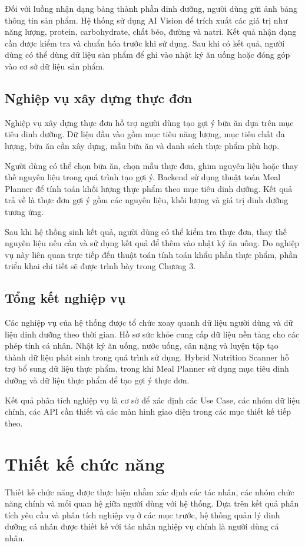 \documentclass[12pt, a4paper]{report}
\begin{document}
Đối với luồng nhận dạng bảng thành phần dinh dưỡng, người dùng gửi ảnh bảng thông tin sản phẩm. Hệ thống sử dụng AI Vision để trích xuất các giá trị như năng lượng, protein, carbohydrate, chất béo, đường và natri. Kết quả nhận dạng cần được kiểm tra và chuẩn hóa trước khi sử dụng. Sau khi có kết quả, người dùng có thể dùng dữ liệu sản phẩm để ghi vào nhật ký ăn uống hoặc đóng góp vào cơ sở dữ liệu sản phẩm.

\subsection{Nghiệp vụ xây dựng thực đơn}Nghiệp vụ xây dựng thực đơn hỗ trợ người dùng tạo gợi ý bữa ăn dựa trên mục tiêu dinh dưỡng. Dữ liệu đầu vào gồm mục tiêu năng lượng, mục tiêu chất đa lượng, bữa ăn cần xây dựng, mẫu bữa ăn và danh sách thực phẩm phù hợp.

Người dùng có thể chọn bữa ăn, chọn mẫu thực đơn, ghim nguyên liệu hoặc thay thế nguyên liệu trong quá trình tạo gợi ý. Backend sử dụng thuật toán Meal Planner để tính toán khối lượng thực phẩm theo mục tiêu dinh dưỡng. Kết quả trả về là thực đơn gợi ý gồm các nguyên liệu, khối lượng và giá trị dinh dưỡng tương ứng.

Sau khi hệ thống sinh kết quả, người dùng có thể kiểm tra thực đơn, thay thế nguyên liệu nếu cần và sử dụng kết quả để thêm vào nhật ký ăn uống. Do nghiệp vụ này liên quan trực tiếp đến thuật toán tính toán khẩu phần thực phẩm, phần triển khai chi tiết sẽ được trình bày trong Chương 3.

\subsection{Tổng kết nghiệp vụ}Các nghiệp vụ của hệ thống được tổ chức xoay quanh dữ liệu người dùng và dữ liệu dinh dưỡng theo thời gian. Hồ sơ sức khỏe cung cấp dữ liệu nền tảng cho các phép tính cá nhân. Nhật ký ăn uống, nước uống, cân nặng và luyện tập tạo thành dữ liệu phát sinh trong quá trình sử dụng. Hybrid Nutrition Scanner hỗ trợ bổ sung dữ liệu thực phẩm, trong khi Meal Planner sử dụng mục tiêu dinh dưỡng và dữ liệu thực phẩm để tạo gợi ý thực đơn.

Kết quả phân tích nghiệp vụ là cơ sở để xác định các Use Case, các nhóm dữ liệu chính, các API cần thiết và các màn hình giao diện trong các mục thiết kế tiếp theo.

\section{Thiết kế chức năng}Thiết kế chức năng được thực hiện nhằm xác định các tác nhân, các nhóm chức năng chính và mối quan hệ giữa người dùng với hệ thống. Dựa trên kết quả phân tích yêu cầu và phân tích nghiệp vụ ở các mục trước, hệ thống quản lý dinh dưỡng cá nhân được thiết kế với tác nhân nghiệp vụ chính là người dùng cá nhân.
\end{document}
